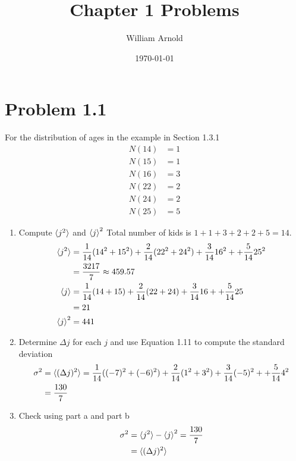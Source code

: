 \documentclass{article}
\title{Chapter 1 Problems}
\author{William Arnold}
\date\today
\begin{document}
\maketitle 

\section*{Problem 1.1}
For the distribution of ages in the example in Section 1.3.1
\begin{align*}
  N(14) &= 1 \\
  N(15) &= 1 \\
  N(16) &= 3 \\
  N(22) &= 2 \\
  N(24) &= 2 \\
  N(25) &= 5
\end{align*}

\begin{enumerate}[label=(\alph*)]
  \item Compute $\braket{j^2}$ and $\braket{j}^2$
    Total number of kids is $1 + 1 + 3 + 2 + 2 + 5 = 14$. 
    \begin{align*}
      \braket{j^2} &= \frac{1}{14}(14^2 + 15^2) + \frac{2}{14}(22^2 + 24^2) + \frac{3}{14}16^2 + + \frac{5}{14}25^2 \\
                   &= \frac{3217}{7} \approx 459.57  \\
      \braket{j} &= \frac{1}{14}(14 + 15) + \frac{2}{14}(22 + 24) + \frac{3}{14}16 + + \frac{5}{14}25 \\
                   &= 21 \\
      \braket{j}^2 &= 441
    \end{align*}
  \item Determine $\Delta j$ for each $j$ and use Equation 1.11 to compute the standard deviation
    \begin{align*}
      \sigma^2 &= \braket{(\Delta j)^2} = \frac{1}{14}((-7)^2 + (-6)^2) + \frac{2}{14}(1^2 + 3^2) + \frac{3}{14}(-5)^2 + + \frac{5}{14}4^2 \\
               &= \frac{130}{7}
    \end{align*}

  \item Check using part a and part b 
    \begin{align*}
      \sigma^2 &= \braket{j^2} - \braket{j}^2 = \frac{130}{7} \\
               &= \braket{(\Delta j)^2} 
    \end{align*}
\end{enumerate}
\end{document}
